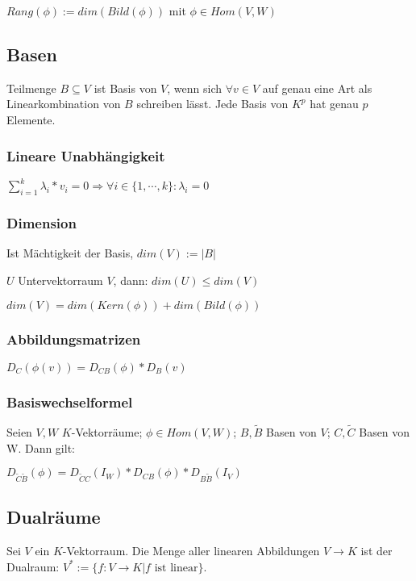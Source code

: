 $Rang(\phi) := dim(Bild(\phi))$ mit $\phi \in Hom(V, W)$

\subsection*{Basen}

Teilmenge $B \subseteq V$ ist Basis von $V$, wenn sich $\forall v \in V$ auf genau eine Art als Linearkombination von $B$ schreiben lässt. Jede Basis von $K^p$ hat genau $p$ Elemente.

\subsubsection*{Lineare Unabhängigkeit}

$\sum_{i=1}^{k} \lambda_i * v_i = 0 \Rightarrow \forall i \in \{1, \cdots, k\} : \lambda_i = 0$

\subsubsection*{Dimension}

Ist Mächtigkeit der Basis, $dim(V) := |B|$

$U$ Untervektorraum $V$, dann: $dim(U) \leq dim(V)$

$dim(V) = dim(Kern(\phi)) + dim(Bild(\phi))$

\subsubsection*{Abbildungsmatrizen}

$D_C(\phi(v)) = D_{CB}(\phi) * D_B(v)$

\subsubsection*{Basiswechselformel}

Seien $V, W$ $K$-Vektorräume; $\phi \in Hom(V, W)$; $B, \tilde B$ Basen von $V$; $C, \tilde C$ Basen von W. Dann gilt:

$D_{\tilde C \tilde B}(\phi) = D_{\tilde C C}(I_W) * D_{CB}(\phi) * D_{B\tilde B}(I_V)$

\subsection*{Dualräume}

Sei $V$ ein $K$-Vektorraum. Die Menge aller linearen Abbildungen $V \rightarrow K$ ist der Dualraum: $V^* := \{f: V \rightarrow K | f \text{ ist linear}\}$.

